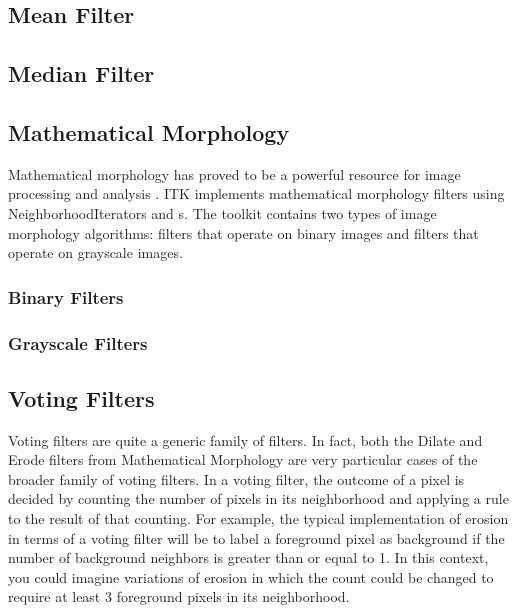 \subsection{Mean Filter}
\label{sec:MeanFilter}



\subsection{Median Filter}
\label{sec:MedianFilter}



\subsection{Mathematical Morphology}
\label{sec:MathematicalMorphology}

Mathematical morphology has proved to be a powerful resource for image
processing and analysis \cite{Serra1982}. ITK implements mathematical
morphology filters using NeighborhoodIterators and
s.  The toolkit contains two types of image
morphology algorithms: filters that operate on binary images and filters that
operate on grayscale images.

\subsubsection{Binary Filters}
\label{sec:MathematicalMorphologyBinaryFilters}



\subsubsection{Grayscale Filters}
\label{sec:MathematicalMorphologyGrayscaleFilters}



\subsection{Voting Filters}
\label{sec:VotingFilters}

Voting filters are quite a generic family of filters. In fact, both the Dilate
and Erode filters from Mathematical Morphology are very particular cases of the
broader family of voting filters. In a voting filter, the outcome of a pixel is
decided by counting the number of pixels in its neighborhood and applying a
rule to the result of that counting.  For example, the typical implementation of
erosion in terms of a voting filter will be to label a foreground pixel
as background if the number of background neighbors is greater than or equal
to 1. In this context, you could imagine variations of erosion in which the
count could be changed to require at least 3 foreground pixels in its
neighborhood.

